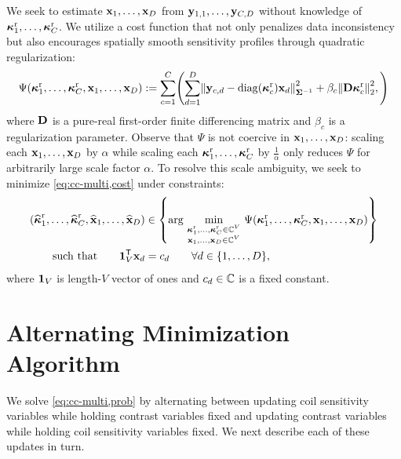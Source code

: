 We seek to estimate $\mathbf{x}_1,\dots,\mathbf{x}_D$
from $\mathbf{y}_{1,1},\dots,\mathbf{y}_{C,D}$ 
without knowledge
of $\boldsymbol{\kappa}^\mathrm{r}_1,\dots,\boldsymbol{\kappa}^\mathrm{r}_C$.
We utilize a cost function
that not only penalizes data inconsistency 
but also encourages spatially smooth sensitivity profiles
through quadratic regularization:
\begin{align}
	\cost\paren{\bmsrx_1,\dots,\bmsrx_C,\bmx_1,\dots,\bmx_D} :=
		\sum_{c=1}^C \paren{%
			\sum_{d=1}^D \norm{\bmy_{c,d}-\diag{\bmsrx_c}\bmx_d}^2_{\bmSig^{-1}}
			+ \beta_c \norm{\bmD\bmsrx_c}^2_2,
		}%
	\label{eq:cc-multi,cost}
\end{align}
where $\mathbf{D}$ is a pure-real first-order finite differencing matrix 
and $\beta_c$ is a regularization parameter.
Observe that $\Psi$ is not coercive 
in $\mathbf{x}_1,\dots,\mathbf{x}_D$:
scaling each $\mathbf{x}_1,\dots,\mathbf{x}_D$ 
by $\alpha$
while scaling each $\boldsymbol{\kappa}^\mathrm{r}_1,\dots,\boldsymbol{\kappa}^\mathrm{r}_C$ 
by $\frac{1}{\alpha}$
only reduces $\Psi$
for arbitrarily large scale factor $\alpha$.
To resolve this scale ambiguity,
we seek to minimize \eqref{eq:cc-multi,cost}
under constraints: 
\begin{align}
	\paren{\bmsrxest_1,\dots,\bmsrxest_C,\est{\bmx}_1,\dots,\est{\bmx}_D} 
		&\in \set{%
			\argmin{%
				\substack{%
					\bmsrx_1,\dots,\bmsrx_C \in \complexes{V} \\
					\bmx_1,\dots,\bmx_D \in \complexes{V}
				}%
			}%
			\cost\paren{\bmsrx_1,\dots,\bmsrx_C,\bmx_1,\dots,\bmx_D}
		} 
		\nonumber
		\\
	\mathrm{such\,\,that} \qquad
	\ones{V}\tpose\bmx_d 
		&= \const{d} \qquad \forall d \in \set{1,\dots,D},
	\label{eq:cc-multi,prob}
\end{align}
where $\boldsymbol{1}_{V}$ is length-$V$ vector of ones
and $c_d \in \mathbb{C}$ is a fixed constant.	

\section{Alternating Minimization Algorithm}
\label{s,cc-multi,alg}

We solve \eqref{eq:cc-multi,prob}
by alternating between
updating coil sensitivity variables 
while holding contrast variables fixed
and
updating contrast variables
while holding coil sensitivity variables fixed.
We next describe each of these updates in turn.

